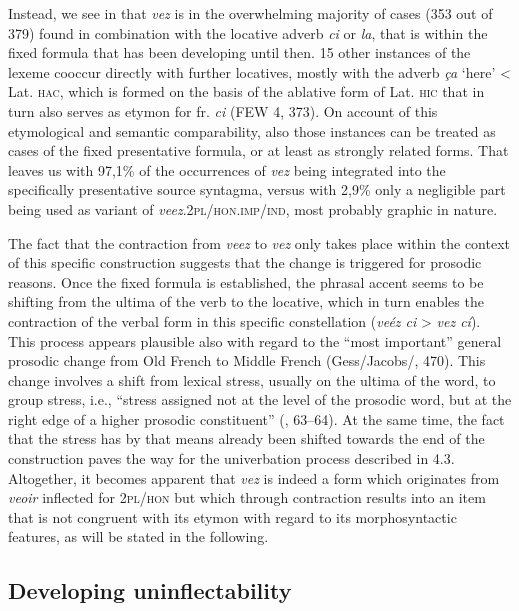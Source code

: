 \documentclass[output=paper]{langscibook}
\begin{document}
\begin{itemize}
\begin{itemize}
\begin{itemize}
\begin{itemize}
\begin{itemize}
\begin{itemize}
\begin{itemize}
\begin{itemize}
\begin{itemize}
\begin{itemize}
\begin{itemize}
\begin{itemize}
Instead, we see in  that \textit{vez} is in the overwhelming majority of cases (353 out of 379) found in combination with the locative adverb \textit{ci} or \textit{la}, that is within the fixed formula that has been developing until then. 15 other instances of the lexeme cooccur directly with further locatives, mostly with the adverb \textit{ça} ‘here’ < Lat. \textsc{hac}, which is formed on the basis of the ablative form of Lat. \textsc{hic} that in turn also serves as etymon for fr. \textit{ci} (FEW 4, 373). On account of this etymological and semantic comparability, also those instances can be treated as cases of the fixed presentative formula, or at least as strongly related forms. That leaves us with 97,1\%  of the occurrences of \textit{vez} being integrated into the specifically presentative source syntagma, versus with 2,9\%  only a negligible part being used as variant of \textit{veez}.\textsc{2pl/hon.imp/ind}, most probably graphic in nature. 

The fact that the contraction from \textit{veez} to \textit{vez} only takes place within the context of this specific construction suggests that the change is triggered for prosodic reasons. Once the fixed formula is established, the phrasal accent seems to be shifting from the ultima of the verb to the locative, which in turn enables the contraction of the verbal form in this specific constellation (\textit{veéz ci} > \textit{vez cí}). This process appears plausible also with regard to the “most important” general prosodic change from Old French to Middle French (Gess/Jacobs/\citealt{Laks2020}, 470). This change involves a shift from lexical stress, usually on the ultima of the word, to group stress, i.e., “stress assigned not at the level of the prosodic word, but at the right edge of a higher prosodic constituent” (\citealt{Rainsford2020}, 63–64). At the same time, the fact that the stress has by that means already been shifted towards the end of the construction paves the way for the univerbation process described in 4.3. Altogether, it becomes apparent that \textit{vez} is indeed a form which originates from \textit{veoir} inflected for \textsc{2pl/hon} but which through contraction results into an item that is not congruent with its etymon with regard to its morphosyntactic features, as will be stated in the following. 

\subsection{Developing uninflectability}


\end{itemize}
\end{itemize}
\end{itemize}
\end{itemize}
\end{itemize}
\end{itemize}
\end{itemize}
\end{itemize}
\end{itemize}
\end{itemize}
\end{itemize}
\end{itemize}
\end{document}
